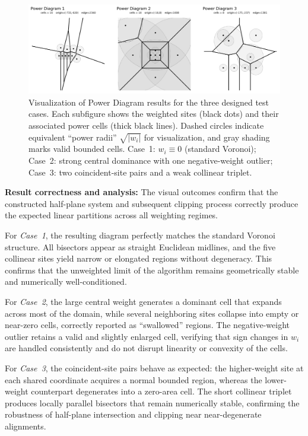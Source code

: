 \documentclass{article}
\begin{document}
\begin{figure}[H]
    \centering
    \includegraphics[width=0.95\linewidth]{Pictures/power_diagram.png}
    \caption{Visualization of Power Diagram results for the three designed test cases.
    Each subfigure shows the weighted sites (black dots) and their associated power cells (thick black lines). 
    Dashed circles indicate equivalent “power radii” $\sqrt{|w_i|}$ for visualization, and gray shading marks valid bounded cells.
    Case~1: $w_i\!\equiv\!0$ (standard Voronoi); 
    Case~2: strong central dominance with one negative-weight outlier; 
    Case~3: two coincident-site pairs and a weak collinear triplet.}
    \label{fig:power_diagrams}
\end{figure}

\textbf{Result correctness and analysis:}  
The visual outcomes confirm that the constructed half-plane system and subsequent clipping process correctly produce the expected linear partitions across all weighting regimes.

For \emph{Case~1}, the resulting diagram perfectly matches the standard Voronoi structure.  
All bisectors appear as straight Euclidean midlines, and the five collinear sites yield narrow or elongated regions without degeneracy.  
This confirms that the unweighted limit of the algorithm remains geometrically stable and numerically well-conditioned.

For \emph{Case~2}, the large central weight generates a dominant cell that expands across most of the domain, while several neighboring sites collapse into empty or near-zero cells, correctly reported as “swallowed” regions.  
The negative-weight outlier retains a valid and slightly enlarged cell, verifying that sign changes in $w_i$ are handled consistently and do not disrupt linearity or convexity of the cells.

For \emph{Case~3}, the coincident-site pairs behave as expected: the higher-weight site at each shared coordinate acquires a normal bounded region, whereas the lower-weight counterpart degenerates into a zero-area cell.  
The short collinear triplet produces locally parallel bisectors that remain numerically stable, confirming the robustness of half-plane intersection and clipping near near-degenerate alignments.
\end{document}
